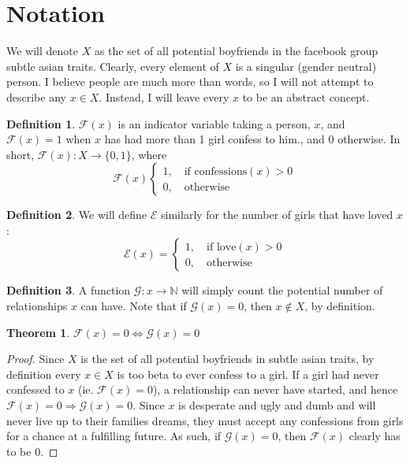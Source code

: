 \documentclass[11pt]{extarticle}
\newtheorem{theorem}{Theorem}[section]
\theoremstyle{definition}
\newtheorem{definition}{Definition}[section]
\begin{document}
\section*{Notation}
We will denote $X$ as the set of all potential boyfriends in the facebook group subtle asian traits. Clearly, every element of $X$ is a singular (gender neutral) person. I believe people are much more than words, so I will not attempt to describe any $x\in X$. Instead, I will leave every $x$ to be an abstract concept. \\
\theoremstyle{definition}
\begin{definition}
$\mathscr{F}(x)$ is an indicator variable taking a person, $x$, and $\mathscr{F}(x)=1$ when $x$ has had more than 1 girl confess to him., and $0$ otherwise. In short, $\mathscr{F}(x):X\rightarrow\{0,1\}$, where $$\mathscr{F}(x)\begin{cases}1,\quad\text{if confessions}(x)>0\\0,\quad\text{otherwise}\end{cases}$$
\end{definition}

\theoremstyle{definition}
\begin{definition}
We will define $\mathscr{E}$ similarly for the number of girls that have loved $x$: $$\mathscr{E}(x)=\begin{cases}1,\quad\text{if love}(x)>0\\0,\quad\text{otherwise}\end{cases}$$
\end{definition}

\theoremstyle{definition}
\begin{definition}
A function $\mathscr{G}:x\rightarrow\mathbb{N}$ will simply count the potential number of relationships $x$ can have. Note that if $\mathscr{G}(x)=0$, then $x\notin X$, by definition. 
\end{definition}


\begin{theorem}
$\mathscr{F}(x)=0\Leftrightarrow\mathscr{G}(x)=0$
\end{theorem}
\begin{proof}
Since $X$ is the set of all potential boyfriends in subtle asian traits, by definition every $x\in X$ is too beta to ever confess to a girl. If a girl had never confessed to $x$ (ie. $\mathscr{F}(x)=0$), a relationship can never have started, and hence $\mathscr{F}(x)=0\Rightarrow\mathscr{G}(x)=0$. Since $x$ is desperate and ugly and dumb and will never live up to their families dreams, they must accept any confessions from girls for a chance at a fulfilling future. As such, if $\mathscr{G}(x)=0$, then $\mathscr{F}(x)$ clearly has to be 0.
\end{proof}
\end{document}
